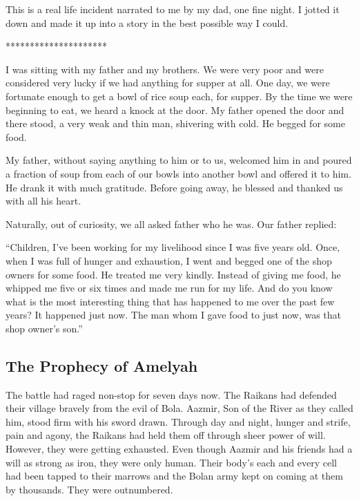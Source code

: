\documentclass[twoside,11pt,titlepage]{article}
\begin{document}
This is a real life incident narrated to me by my dad, one fine night. I jotted it down and made it up into a story in the best possible way I could.

\bigskip
\begin{center}
*********************
\end{center}

I was sitting with my father and my brothers. We were very poor and were considered very lucky if we had anything for supper at all. One day, we were fortunate enough to get a bowl of rice soup each, for supper. By the time we were beginning to eat, we heard a knock at the door. My father opened the door and there stood, a very weak and thin man, shivering with cold. He begged for some food.

My father, without saying anything to him or to us, welcomed him in and poured a fraction of soup from each of our bowls into another bowl and offered it to him. He drank it with much gratitude. Before going away, he blessed and thanked us with all his heart.

Naturally, out of curiosity, we all asked father who he was. Our father replied:

``Children, I've been working for my livelihood since I was five years old. Once, when I was full of hunger and exhaustion, I went and begged one of the shop owners for some food. He treated me very kindly. Instead of giving me food, he whipped me five or six times and made me run for my life. And do you know what is the most interesting thing that has happened to me over the past few years? It happened just now. The man whom I gave food to just now, was that shop owner's son.''

\newpage
\begin{center}
  \section{The Prophecy of Amelyah}
\end{center}
\bigskip
\bigskip
\bigskip
The battle had raged non-stop for seven days now. The Raikans had defended their village bravely from the evil of Bola. Aazmir, Son of the River as they called him, stood firm with his sword drawn. Through day and night, hunger and strife, pain and agony, the Raikans had held them off through sheer power of will. However, they were getting exhausted. Even though Aazmir and his friends had a will as strong as iron, they were only human. Their body's each and every cell had been tapped to their marrows and the Bolan army kept on coming at them by thousands. They were outnumbered.
\end{document}

